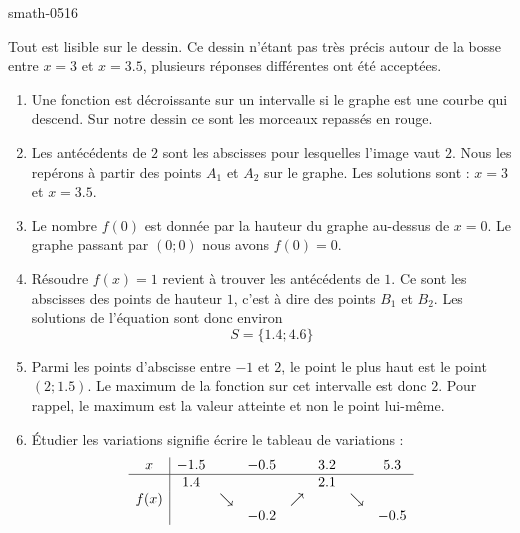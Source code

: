 
\begin{corrige}{smath-0516}


    Tout est lisible sur le dessin. Ce dessin n'étant pas très précis autour de la bosse entre \( x=3\) et \( x=3.5\), plusieurs réponses différentes ont été acceptées.

    \begin{center}
   
    \end{center}

    \begin{enumerate}
        \item
            Une fonction est décroissante sur un intervalle si le graphe est une courbe qui descend. Sur notre dessin ce sont les morceaux repassés en rouge.
        \item
            Les antécédents de \( 2\) sont les abscisses pour lesquelles l'image vaut \( 2\). Nous les repérons à partir des points \( A_1\) et \( A_2\) sur le graphe. Les solutions sont : \( x=3\) et \( x=3.5\). 

        \item

            Le nombre \( f(0)\) est donnée par la hauteur du graphe au-dessus de \( x=0\). Le graphe passant par \( (0;0)\) nous avons \( f(0)=0\).
        \item
            Résoudre \( f(x)=1\) revient à trouver les antécédents de \( 1\). Ce sont les abscisses des points de hauteur \( 1\), c'est à dire des points \( B_1\) et \( B_2\). Les solutions de l'équation sont donc environ
            \begin{equation}
                S=\{ 1.4;4.6 \}
            \end{equation}
        \item
            Parmi les points d'abscisse entre \( -1\) et \( 2\), le point le plus haut est le point \( (2;1.5)\). Le maximum de la fonction sur cet intervalle est donc \( 2\). Pour rappel, le maximum est la valeur atteinte et non le point lui-même.
        \item
            Étudier les variations signifie écrire le tableau de variations :
            \begin{equation*}
                \begin{array}[]{c|ccccccc}
                    x&-1.5&&-0.5&&3.2&&5.3\\
                    \hline
                    &1.4&&&&2.1&&\\
                    f(x)&&\searrow&&\nearrow&&\searrow&\\
                    &&&-0.2&&&&-0.5\\
                \end{array}
            \end{equation*}
    \end{enumerate}

\end{corrige}
